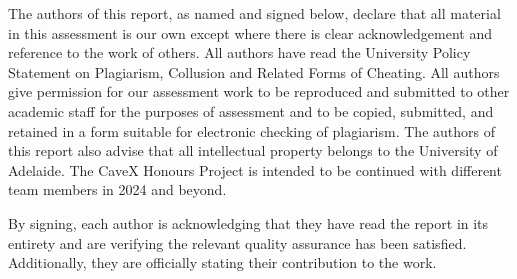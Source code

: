 The authors of this report, as named and signed below, declare that all material in this assessment is our own except where there is clear acknowledgement and reference to the work of others. All authors have read the University Policy Statement on Plagiarism, Collusion and Related Forms of Cheating. All authors give permission for our assessment work to be reproduced and submitted to other academic staff for the purposes of assessment and to be copied, submitted, and retained in a form suitable for electronic checking of plagiarism. The authors of this report also advise that all intellectual property belongs to the University of Adelaide. The CaveX Honours Project is intended to be continued with different team members in 2024 and beyond.

By signing, each author is acknowledging that they have read the report in its entirety and are verifying the relevant quality assurance has been satisfied. Additionally, they are officially stating their contribution to the work.

